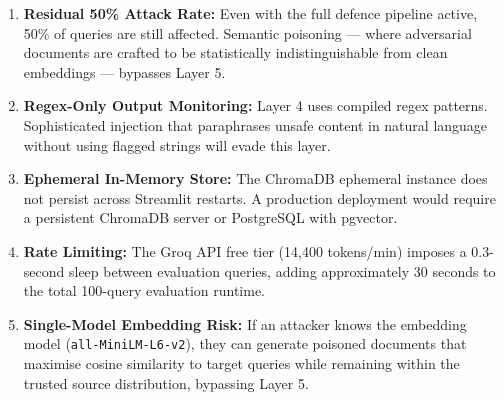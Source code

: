 \begin{enumerate}
    \item \textbf{Residual 50\% Attack Rate:} Even with the full defence pipeline active, 50\% of queries are still affected. Semantic poisoning --- where adversarial documents are crafted to be statistically indistinguishable from clean embeddings --- bypasses Layer 5.
    \item \textbf{Regex-Only Output Monitoring:} Layer 4 uses compiled regex patterns. Sophisticated injection that paraphrases unsafe content in natural language without using flagged strings will evade this layer.
    \item \textbf{Ephemeral In-Memory Store:} The ChromaDB ephemeral instance does not persist across Streamlit restarts. A production deployment would require a persistent ChromaDB server or PostgreSQL with pgvector.
    \item \textbf{Rate Limiting:} The Groq API free tier (14,400 tokens/min) imposes a 0.3-second sleep between evaluation queries, adding approximately 30 seconds to the total 100-query evaluation runtime.
    \item \textbf{Single-Model Embedding Risk:} If an attacker knows the embedding model (\texttt{all-MiniLM-L6-v2}), they can generate poisoned documents that maximise cosine similarity to target queries while remaining within the trusted source distribution, bypassing Layer 5.
\end{enumerate}
